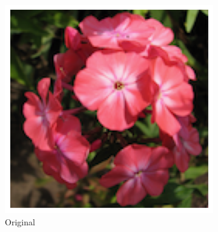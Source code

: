 \documentclass{article}
\begin{document}





\begin{figure}
  \centering
	\begin{subfigure}[b]{0.24\textwidth}
		\includegraphics[width= \textwidth]{path0}
		\caption{Original}
		\label{fg:path0}
	\end{subfigure}
	\begin{subfigure}[b]{0.24\textwidth}

\end{subfigure}
\end{figure}
\end{document}

